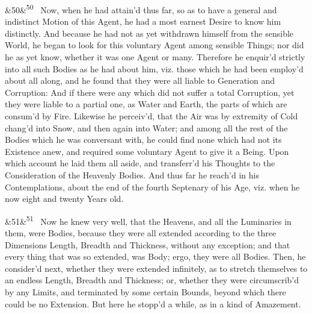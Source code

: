 \documentclass[12pt]{article}
\newcommand{\para}[1][]{\par\noindent\ifx&#1&\else\textsuperscript{\footnotesize #1}~\fi}
\begin{document}
\para[50] Now, when he had attain'd thus far, so as to have a general and indistinct Motion of this Agent, he had a most earnest Desire to know him distinctly. And because he had not as yet withdrawn himself from the sensible World, he began to look for this voluntary Agent among sensible Things; nor did he as yet know, whether it was one Agent or many. Therefore he enquir'd strictly into all such Bodies as he had about him, viz. those which he had been employ'd about all along, and he found that they were all liable to Generation and Corruption: And if there were any which did not suffer a total Corruption, yet they were liable to a partial one, as Water and Earth, the parts of which are consum'd by Fire. Likewise he perceiv'd, that the Air was by extremity of Cold chang'd into Snow, and then again into Water; and among all the rest of the Bodies which he was conversant with, he could find none which had not its Existence anew, and required some voluntary Agent to give it a Being. Upon which account he laid them all aside, and transferr'd his Thoughts to the Consideration of the Heavenly Bodies. And thus far he reach'd in his Contemplations, about the end of the fourth Septenary of his Age, viz. when he now eight and twenty Years old.

\para[51] Now he knew very well, that the Heavens, and all the Luminaries in them, were Bodies, because they were all extended according to the three Dimensions Length, Breadth and Thickness, without any exception; and that every thing that was so extended, was Body; ergo, they were all Bodies. Then, he consider'd next, whether they were extended infinitely, as to stretch themselves to an endless Length, Breadth and Thickness; or, whether they were circumscrib'd by any Limits, and terminated by some certain Bounds, beyond which there could be no Extension. But here he stopp'd a while, as in a kind of Amazement.
\end{document}
